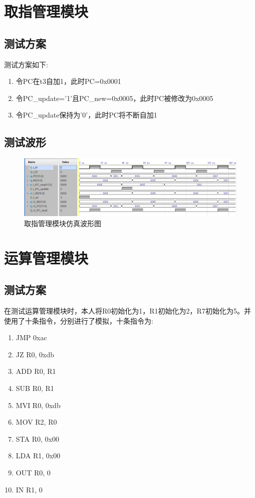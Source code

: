 \documentclass[forprint]{WHUBachelor}
\begin{document}
\section{取指管理模块}

\subsection{测试方案}

测试方案如下:
\begin{enumerate}[1.]
\item 令PC在t3自加1，此时PC=0x0001
\item 令PC\_update='1'且PC\_new=0x0005，此时PC被修改为0x0005
\item 令PC\_update保持为'0'，此时PC将不断自加1
\end{enumerate}

\subsection{测试波形}

\begin{figure}[H]
  \centering
  \includegraphics[width=7in]{figures/waveforms/fetch.png}
  \caption{取指管理模块仿真波形图}
  \label{fig:wave:fetch}
\end{figure}
\restoregeometry

\section{运算管理模块}

\subsection{测试方案}

在测试运算管理模块时，本人将R0初始化为1，R1初始化为2，R7初始化为5。并使用了十条指令，分别进行了模拟，十条指令为:
\begin{enumerate}[1.]
\item JMP 0xac
\item JZ R0, 0xdb
\item ADD R0, R1
\item SUB R0, R1
\item MVI R0, 0xdb
\item MOV R2, R0
\item STA R0, 0x00
\item LDA R1, 0x00
\item OUT R0, 0
\item IN R1, 0
\end{enumerate}
\end{document}
